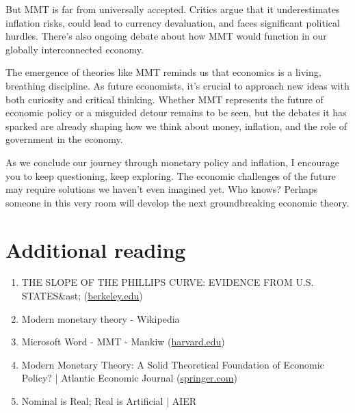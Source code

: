 \documentclass[10pt]{article}
\begin{document}
But MMT is far from universally accepted. Critics argue that it underestimates inflation risks, could lead to currency devaluation, and faces significant political hurdles. There's also ongoing debate about how MMT would function in our globally interconnected economy.

The emergence of theories like MMT reminds us that economics is a living, breathing discipline. As future economists, it's crucial to approach new ideas with both curiosity and critical thinking. Whether MMT represents the future of economic policy or a misguided detour remains to be seen, but the debates it has sparked are already shaping how we think about money, inflation, and the role of government in the economy.

As we conclude our journey through monetary policy and inflation, I encourage you to keep questioning, keep exploring. The economic challenges of the future may require solutions we haven't even imagined yet. Who knows? Perhaps someone in this very room will develop the next groundbreaking economic theory.

\section*{Additional reading}
\begin{enumerate}
  \item THE SLOPE OF THE PHILLIPS CURVE: EVIDENCE FROM U.S. STATES\&ast; (\href{http://berkeley.edu}{berkeley.edu})
  \item Modern monetary theory - Wikipedia
  \item Microsoft Word - MMT - Mankiw (\href{http://harvard.edu}{harvard.edu})
  \item Modern Monetary Theory: A Solid Theoretical Foundation of Economic Policy? | Atlantic Economic Journal (\href{http://springer.com}{springer.com})
  \item Nominal is Real; Real is Artificial | AIER
\end{enumerate}
\end{document}
